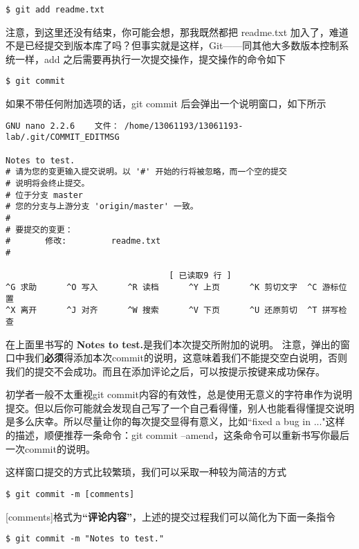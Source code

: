 \begin{verbatim}
$ git add readme.txt
\end{verbatim}
\label{git add}
注意，到这里还没有结束，你可能会想，那我既然都把 readme.txt 加入了，难道不是已经提交到版本库了吗？但事实就是这样，Git——同其他大多数版本控制系统一样，add 之后需要再执行一次提交操作，提交操作的命令如下

\begin{verbatim}
$ git commit
\end{verbatim}

如果不带任何附加选项的话，git commit 后会弹出一个说明窗口，如下所示

\begin{verbatim}
GNU nano 2.2.6    文件： /home/13061193/13061193-lab/.git/COMMIT_EDITMSG              

Notes to test.
# 请为您的变更输入提交说明。以 '#' 开始的行将被忽略，而一个空的提交
# 说明将会终止提交。
# 位于分支 master
# 您的分支与上游分支 'origin/master' 一致。
#
# 要提交的变更：
#       修改:         readme.txt
#

                                 [ 已读取9 行 ]
^G 求助      ^O 写入      ^R 读档      ^Y 上页      ^K 剪切文字  ^C 游标位置
^X 离开      ^J 对齐      ^W 搜索      ^V 下页      ^U 还原剪切  ^T 拼写检查
\end{verbatim}


在上面里书写的 \textbf{Notes to test.}是我们本次提交所附加的说明。
注意，弹出的窗口中我们\textbf{必须}得添加本次commit的说明，这意味着我们不能提交空白说明，否则我们的提交不会成功。而且在添加评论之后，可以按提示按键来成功保存。

\begin{note}
初学者一般不太重视git commit内容的有效性，总是使用无意义的字符串作为说明提交。但以后你可能就会发现自己写了一个自己看得懂，别人也能看得懂提交说明是多么庆幸。所以尽量让你的每次提交显得有意义，比如“fixed a bug in ..."这样的描述，顺便推荐一条命令：git commit --amend，这条命令可以重新书写你最后一次commit的说明。
\end{note}

这样窗口提交的方式比较繁琐，我们可以采取一种较为简洁的方式\label{git commit}
\begin{verbatim}
$ git commit -m [comments]
\end{verbatim}

[comments]格式为\textbf{“评论内容”}，上述的提交过程我们可以简化为下面一条指令

\begin{verbatim}
$ git commit -m "Notes to test."
\end{verbatim}

